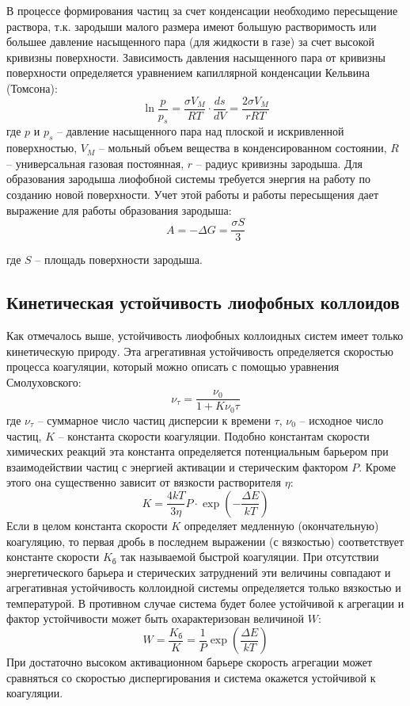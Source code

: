 \documentclass[a4paper, 12pt]{article}
\begin{document}
В процессе формирования частиц за счет конденсации необходимо пересыщение
раствора, т.к. зародыши малого размера имеют большую растворимость или большее
давление насыщенного пара (для жидкости в газе) за счет высокой кривизны поверхности.
Зависимость давления насыщенного пара от кривизны поверхности определяется
уравнением капиллярной конденсации Кельвина (Томсона):
\[\ln{\frac{p}{p_s} = \frac{\sigma V_M}{RT}\cdot \frac{ds}{dV}} = \frac{2\sigma V_M}{rRT}\]
где $p$ и $p_s$ – давление насыщенного пара над плоской и искривленной поверхностью, $V_M$ –
мольный объем вещества в конденсированном состоянии, $R$ – универсальная газовая
постоянная, $r$ – радиус кривизны зародыша.
Для образования зародыша лиофобной системы требуется энергия на работу по
созданию новой поверхности. Учет этой работы и работы пересыщения дает выражение
для работы образования зародыша:
\[A=-\Delta G=\frac{\sigma S}{3}\]

где $S$ – площадь поверхности зародыша.
\subsection*{Кинетическая устойчивость лиофобных коллоидов}
Как отмечалось выше, устойчивость лиофобных коллоидных систем имеет только
кинетическую природу. Эта агрегативная устойчивость определяется скоростью процесса
коагуляции, который можно описать с помощью уравнения Смолуховского:
\[\nu_\tau = \frac{\nu_0}{1+K\nu_0 \tau}\]
где $\nu_\tau$ – суммарное число частиц дисперсии к времени $\tau$, $\nu_0$ – исходное число частиц, $K$ –
константа скорости коагуляции. Подобно константам скорости химических реакций эта
константа определяется потенциальным барьером при взаимодействии частиц с энергией
активации и стерическим фактором $P$. Кроме этого она существенно зависит от
вязкости растворителя $\eta$:
\[K=\frac{4kT}{3\eta}P\cdot \exp\left(-\frac{\Delta E}{kT}\right)\]
Если в целом константа скорости $K$ определяет медленную (окончательную) коагуляцию,
то первая дробь в последнем выражении (с вязкостью) соответствует константе скорости
$K_\text{б}$ так называемой быстрой коагуляции. При отсутствии энергетического барьера и
стерических затруднений эти величины совпадают и агрегативная устойчивость
коллоидной системы определяется только вязкостью и температурой. В противном случае
система будет более устойчивой к агрегации и фактор устойчивости может быть
охарактеризован величиной $W$:
\[W = \frac{K_\text{б}}{K}=\frac{1}{P}\exp\left(\frac{\Delta E}{kT}\right)\]
При достаточно высоком активационном барьере скорость агрегации может сравняться со
скоростью диспергирования и система окажется устойчивой к коагуляции.
\end{document}
